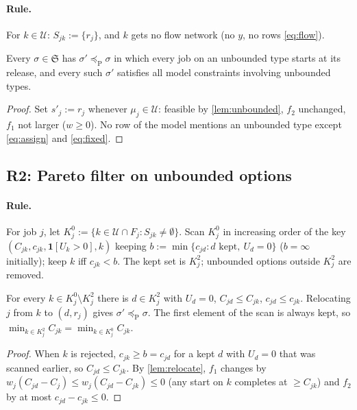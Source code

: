 \documentclass[11pt,a4paper]{article}
\newcommand{\U}{\mathcal{U}}
\newcommand{\Sched}{\mathfrak{S}}
\newcommand{\preceqP}{\preceq_{\mathrm{P}}}
\newcommand{\ind}[1]{\mathbf{1}[#1]}
\begin{document}
\paragraph{Rule.} For $k\in\U$: $S_{jk}:=\{r_j\}$, and $k$ gets no flow
network (no $y$, no rows \eqref{eq:flow}).

\begin{lemma}\label{lem:R1}
Every $\sigma\in\Sched$ has $\sigma'\preceqP\sigma$ in which every job on an
unbounded type starts at its release, and every such $\sigma'$ satisfies all
model constraints involving unbounded types.
\end{lemma}
\begin{proof}
Set $s'_j:=r_j$ whenever $\mu_j\in\U$: feasible by \cref{lem:unbounded},
$f_2$ unchanged, $f_1$ not larger ($w\ge0$). No row of the model mentions an
unbounded type except \eqref{eq:assign} and \eqref{eq:fixed}.
\end{proof}

\subsection{R2: Pareto filter on unbounded options}

\paragraph{Rule.} For job $j$, let $K^0_j:=\{k\in\U\cap F_j:S_{jk}\ne\emptyset\}$.
Scan $K^0_j$ in increasing order of the key $(C_{jk},c_{jk},\ind{U_k>0},k)$
keeping $b:=\min\{c_{jd}: d\text{ kept},\ U_d=0\}$ ($b=\infty$ initially);
keep $k$ iff $c_{jk}<b$. The kept set is $K^2_j$; unbounded options outside
$K^2_j$ are removed.

\begin{lemma}\label{lem:R2}
For every $k\in K^0_j\setminus K^2_j$ there is $d\in K^2_j$ with $U_d=0$,
$C_{jd}\le C_{jk}$, $c_{jd}\le c_{jk}$. Relocating $j$ from $k$ to $(d,r_j)$
gives $\sigma'\preceqP\sigma$. The first element of the scan is always kept,
so $\min_{k\in K^2_j}C_{jk}=\min_{k\in K^0_j}C_{jk}$.
\end{lemma}
\begin{proof}
When $k$ is rejected, $c_{jk}\ge b=c_{jd}$ for a kept $d$ with $U_d=0$ that
was scanned earlier, so $C_{jd}\le C_{jk}$. By \cref{lem:relocate},
$f_1$ changes by $w_j(C_{jd}-C_j)\le w_j(C_{jd}-C_{jk})\le0$ (any start on $k$
completes at $\ge C_{jk}$) and $f_2$ by at most $c_{jd}-c_{jk}\le0$.
\end{proof}
\end{document}

